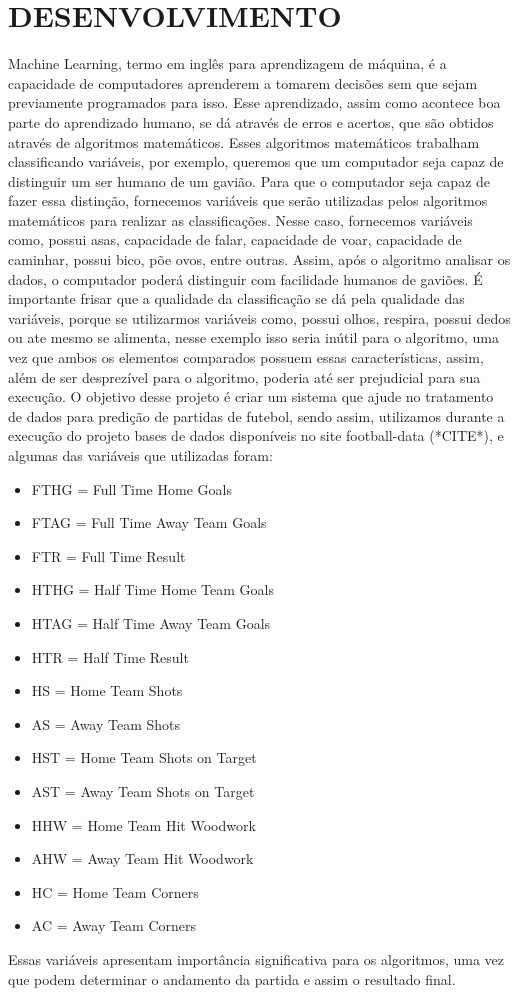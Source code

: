 \section{DESENVOLVIMENTO}
Machine Learning, termo em inglês para aprendizagem de máquina, é a capacidade de computadores aprenderem a tomarem decisões sem que sejam previamente programados para isso. Esse aprendizado, assim como acontece boa parte do aprendizado humano, se dá através de erros e acertos, que são obtidos através de algoritmos matemáticos. Esses algoritmos matemáticos trabalham classificando variáveis, por exemplo, queremos que um computador seja capaz de distinguir um ser humano de um gavião. Para que o computador seja capaz de fazer essa distinção, fornecemos variáveis que serão utilizadas pelos algoritmos matemáticos para realizar as classificações. Nesse caso, fornecemos variáveis como, possui asas, capacidade de falar, capacidade de voar, capacidade de caminhar, possui bico, põe ovos, entre outras. Assim, após o algoritmo analisar os dados, o computador poderá distinguir com facilidade humanos de gaviões. 
É importante frisar que a qualidade da classificação se dá pela qualidade das variáveis, porque se utilizarmos variáveis como, possui olhos, respira, possui dedos ou ate mesmo se alimenta, nesse exemplo isso seria inútil para o algoritmo, uma vez que ambos os elementos comparados possuem essas características, assim, além de ser desprezível para o algoritmo, poderia até ser prejudicial para sua execução. 
O objetivo desse projeto é criar um sistema que ajude no tratamento de dados para predição de partidas de futebol, sendo assim, utilizamos durante a execução do projeto bases de dados disponíveis no site football-data (*CITE*), e algumas das variáveis que utilizadas foram:
\begin{itemize}
	\item FTHG = Full Time Home Goals
	\item FTAG = Full Time Away Team Goals
	\item FTR = Full Time Result
	\item HTHG = Half Time Home Team Goals
	\item HTAG = Half Time Away Team Goals
	\item HTR = Half Time Result
	\item HS = Home Team Shots
	\item AS = Away Team Shots
	\item HST = Home Team Shots on Target
	\item AST = Away Team Shots on Target
	\item HHW = Home Team Hit Woodwork
	\item AHW = Away Team Hit Woodwork
	\item HC = Home Team Corners
	\item AC = Away Team Corners
\end{itemize}
Essas variáveis apresentam importância significativa para os algoritmos, uma vez que podem determinar o andamento da partida e assim o resultado final.


